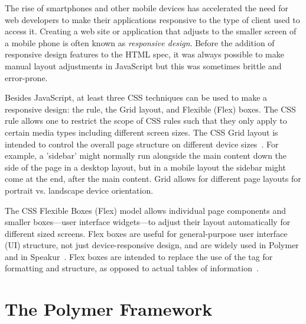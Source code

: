 The rise of smartphones and other mobile devices has accelerated the need for web developers to make their applications responsive to the type of client used to access it.
Creating a web site or application that adjusts to the smaller screen of a mobile phone is often known as \textit{responsive design}.
Before the addition of responsive design features to the HTML spec, 
it was always possible to make manual layout adjustments in JavaScript but this was sometimes brittle and error-prone.

Besides JavaScript, at least three CSS techniques can be used to make a responsive design: 
the  rule, 
the Grid layout, 
and Flexible (Flex) boxes.
The CSS  rule allows one to restrict the scope of CSS rules such that they only apply to certain media types including different screen sizes.
The CSS Grid layout is intended to control the overall page structure on different device sizes~\cite{w3ccontributors2015-d}.
For example, a 'sidebar' might normally run alongside the main content down the side of the page in a desktop layout, but in a mobile layout the sidebar might come at the end, after the main content.
Grid allows for different page layouts for portrait vs. landscape device orientation.

The CSS Flexible Boxes (Flex) model allows individual page components and smaller boxes---user interface widgets---to adjust their layout automatically for different sized screens.
Flex boxes are useful for general-purpose user interface (UI) structure, not just device-responsive design, and are widely used in Polymer and in Speakur~\cite{polymercontributors2015-d}.
Flex boxes are intended to replace the use of the  tag for formatting and structure, as opposed to actual tables of information~\cite{mozillacontributors2015}.

\section{The Polymer Framework}

